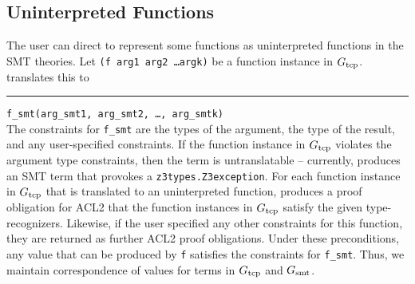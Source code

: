 \subsection{Uninterpreted Functions}
The user can direct \smtlink{} to represent some functions as uninterpreted functions
in the SMT theories.  Let \texttt{(f arg1 arg2 \ldots argk)} be a function instance
in $G_{\mathrm{tcp}}$.  \smtlink translates this to\\
\rule{2em}{0ex}\texttt{f\_smt(arg\_smt1, arg\_smt2, \ldots, arg\_smtk)}\\
The constraints for \texttt{f\_smt} are the types of the argument, the type of the
result, and any user-specified constraints.
If the function instance in $G_{\mathrm{tcp}}$ violates the argument type constraints, then
the term is untranslatable -- currently, \smtlink{} produces an SMT term
that provokes a \texttt{z3types.Z3exception}.
For each function instance in $G_{\mathrm{tcp}}$ that is translated to an uninterpreted function,
\smtlink{} produces a proof obligation for ACL2 that the function instances in
$G_{\mathrm{tcp}}$ satisfy the given type-recognizers.  Likewise, if the user specified
any other constraints for this function, they are returned as further ACL2 proof
obligations.
Under these preconditions, any value that can be produced by \texttt{f} satisfies the
constraints for \texttt{f\_smt}.
Thus, we maintain correspondence of values for terms in $G_{\mathrm{tcp}}$ and $G_{\mathrm{smt}}$.

